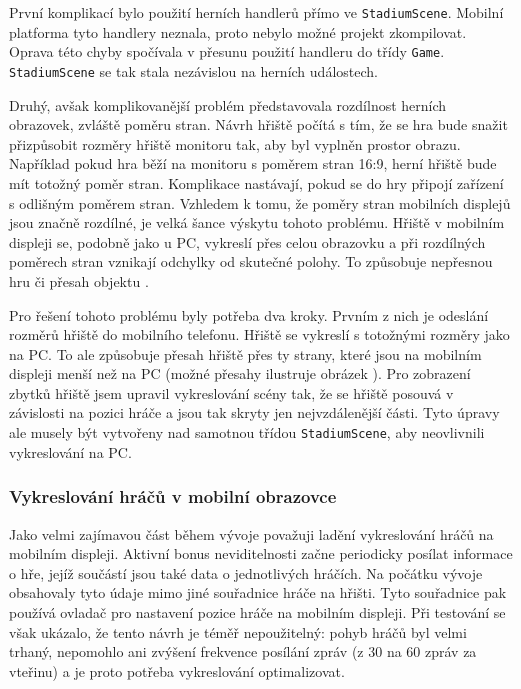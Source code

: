 \documentclass[thesis=B,czech,hidelinks]{FITthesis}[2012/06/26] %
\newcommand{\code}[1]{\texttt{#1}}
\begin{document}
První komplikací bylo použití herních handlerů přímo ve \code{StadiumScene}. Mobilní platforma tyto handlery neznala, proto nebylo možné projekt zkompilovat. Oprava této chyby spočívala v přesunu použití handleru do třídy \code{Game}. \code{StadiumScene} se tak stala nezávislou na herních událostech.

Druhý, avšak komplikovanější problém představovala rozdílnost herních obrazovek, zvláště poměru stran. Návrh hřiště počítá s tím, že se hra bude snažit přizpůsobit rozměry hřiště monitoru tak, aby byl vyplněn prostor obrazu. Například pokud hra běží na monitoru s poměrem stran 16:9, herní hřiště bude mít totožný poměr stran. Komplikace nastávají, pokud se do hry připojí zařízení s odlišným poměrem stran. Vzhledem k tomu, že poměry stran mobilních displejů jsou značně rozdílné, je velká šance výskytu tohoto problému. Hřiště v mobilním displeji se, podobně jako u PC, vykreslí přes celou obrazovku a při rozdílných poměrech stran vznikají odchylky od skutečné polohy. To způsobuje nepřesnou hru či přesah objektu .

Pro řešení tohoto problému byly potřeba dva kroky. Prvním z nich je odeslání rozměrů hřiště do mobilního telefonu. Hřiště se vykreslí s totožnými rozměry jako na PC. To ale způsobuje přesah hřiště přes ty strany, které jsou na mobilním displeji menší než na PC (možné přesahy ilustruje obrázek ). Pro zobrazení zbytků hřiště jsem upravil vykreslování scény tak, že se hřiště posouvá v závislosti na pozici hráče a jsou tak skryty jen nejvzdálenější části. Tyto úpravy ale musely být vytvořeny nad samotnou třídou \code{StadiumScene}, aby neovlivnili vykreslování na PC.

\subsubsection{Vykreslování hráčů v mobilní obrazovce}

Jako velmi zajímavou část během vývoje považuji ladění vykreslování hráčů na mobilním displeji. Aktivní bonus neviditelnosti začne periodicky posílat informace o hře, jejíž součástí jsou také data o jednotlivých hráčích. Na počátku vývoje obsahovaly tyto údaje mimo jiné souřadnice hráče na hřišti. Tyto souřadnice pak používá ovladač pro nastavení pozice hráče na mobilním displeji. Při testování se však ukázalo, že tento návrh je téměř nepoužitelný: pohyb hráčů byl velmi trhaný, nepomohlo ani zvýšení frekvence posílání zpráv (z 30 na 60 zpráv za vteřinu) a je proto potřeba vykreslování optimalizovat.
\end{document}
